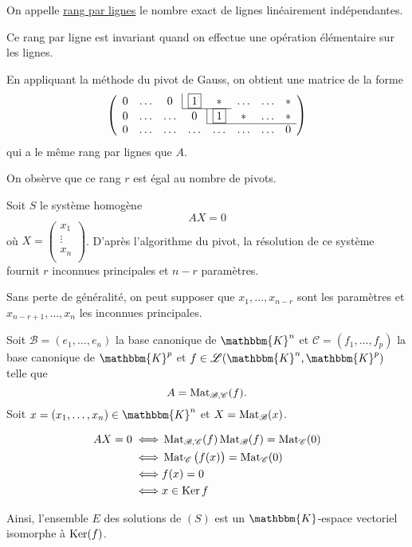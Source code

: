 \begin{prv}
	On appelle \underline{rang par lignes} le nombre exact de lignes linéairement indépendantes.
	
	Ce rang par ligne est invariant quand on effectue une opération élémentaire sur les lignes.

	En appliquant la méthode du pivot de Gauss, on obtient une matrice de la forme \[
		\left(\begin{array}{c c c c c c c c}
				0&\ldots&0&\multicolumn{1}{|c}{\bx1} & * & \ldots &\ldots& *\\ \cline{4-5}
				0&\ldots&\ldots&0&\multicolumn{1}{|c}{\bx1} & * & \ldots & *\\ \cline{5-8}
				0&\ldots&\ldots&\ldots&\ldots&\ldots&\ldots&0\\
		\end{array}\right)
	\] qui a le même rang par lignes que $A$.

	On obsèrve que ce rang $r$ est égal au nombre de pivots.

	Soit $S$ le système homogène \[
		AX = 0
	\] où $X = \begin{pmatrix}
		x_1\\
		\vdots\\
		x_n\\
	\end{pmatrix}$. D'après l'algorithme du pivot, la résolution de ce système fournit $r$ inconnues principales et $n-r$ paramètres.

	Sans perte de généralité, on peut supposer que $x_1, \ldots, x_{n-r}$ sont les paramètres et $x_{n-r+1},\ldots, x_n$ les inconnues principales.

	Soit $\mathcal{B}=(e_1, \ldots, e_n)$ la base canonique de $\mathbbm{K}^n$ et $\mathcal{C} = (f_1, \ldots, f_p)$ la base canonique de $\mathbbm{K}^p$ et $f \in \mathcal{L}(\mathbbm{K}^n, \mathbbm{K}^p)$ telle que \[
		A = \operatorname{Mat}_{\mathcal{B},\mathcal{C}}(f)
	.\]
	Soit $x = (x_1, \ldots, x_n) \in \mathbbm{K}^n$ et $X = \operatorname{Mat}_\mathcal{B}(x)$.

	\begin{align*}
		AX = 0 \iff& \operatorname{Mat}_{\mathcal{B}, \mathcal{C}}(f) \operatorname{Mat}_\mathcal{B}(f) = \operatorname{Mat}_\mathcal{C}(0)\\
		\iff& \operatorname{Mat}_\mathcal{C}\big(f(x)\big) = \operatorname{Mat}_\mathcal{C}(0)\\
		\iff& f(x) = 0\\
		\iff& x \in \operatorname{Ker} f
	\end{align*}

	Ainsi, l'ensemble $E$ des solutions de $(S)$ est un $\mathbbm{K}$-espace vectoriel isomorphe à $\operatorname{Ker}(f)$.


\end{prv}
